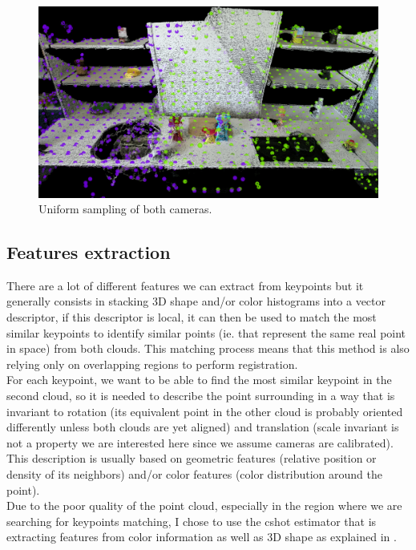    \begin{figure}[h!]
        \centering
        \includegraphics[width=\textwidth]{images/unif_100.png}
        \caption{Uniform sampling of both cameras.}
        \label{fig:sift_kp}
    \end{figure}    

\subsection{Features extraction}

    There are a lot of different features we can extract from keypoints but it generally consists in stacking 3D shape and/or color histograms into a vector descriptor, if this descriptor is local, it can then be used to match the most similar keypoints to identify similar points (ie. that represent the same real point in space) from both clouds. This matching process means that this method is also relying only on overlapping regions to perform registration. \\
    For each keypoint, we want to be able to find the most similar keypoint in the second cloud, so it is needed to describe the point surrounding in a way that is invariant to rotation (its equivalent point in the other cloud is probably oriented differently unless both clouds are yet aligned) and translation (scale invariant is not a property we are interested here since we assume cameras are calibrated). This description is usually based on geometric features (relative position or density of its neighbors) and/or color features (color distribution around the point). \\
    Due to the poor quality of the point cloud, especially in the region where we are searching for keypoints matching, I chose to use the \acrshort{cshot} estimator that is extracting features from color information as well as 3D shape as explained in \cite{tombari2011}.
    
